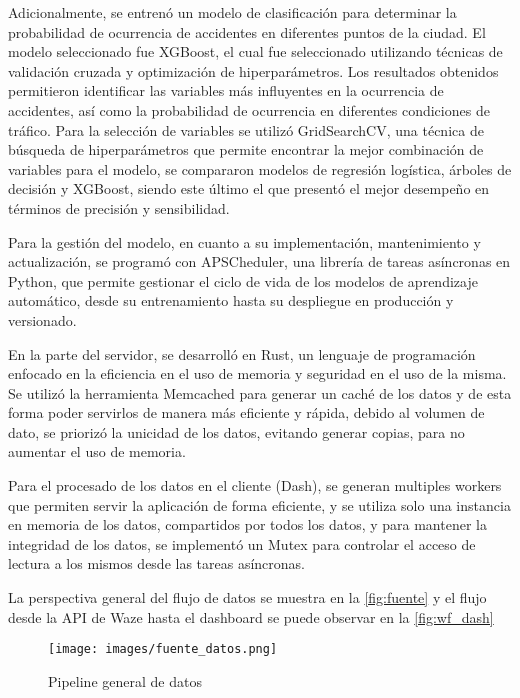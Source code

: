 \documentclass[12pt]{article}
\begin{document}
Adicionalmente, se entrenó un modelo de clasificación para determinar la probabilidad de ocurrencia de accidentes en diferentes puntos de la ciudad. El modelo seleccionado fue XGBoost, el cual fue seleccionado utilizando técnicas de validación cruzada y optimización de hiperparámetros. Los resultados obtenidos permitieron identificar las variables más influyentes en la ocurrencia de accidentes, así como la probabilidad de ocurrencia en diferentes condiciones de tráfico. Para la selección de variables se utilizó GridSearchCV, una técnica de búsqueda de hiperparámetros que permite encontrar la mejor combinación de variables para el modelo, se compararon modelos de regresión logística, árboles de decisión y XGBoost, siendo este último el que presentó el mejor desempeño en términos de precisión y sensibilidad.

Para la gestión del modelo, en cuanto a su implementación, mantenimiento y actualización, se programó con APSCheduler, una librería de tareas asíncronas en Python, que permite gestionar el ciclo de vida de los modelos de aprendizaje automático, desde su entrenamiento hasta su despliegue en producción y versionado.

En la parte del servidor, se desarrolló en Rust, un lenguaje de programación enfocado en la eficiencia en el uso de memoria y seguridad en el uso de la misma. Se utilizó la herramienta Memcached para generar un caché de los datos y de esta forma poder servirlos de manera más eficiente y rápida, debido al volumen de dato, se priorizó la unicidad de los datos, evitando generar copias, para no aumentar el uso de memoria.

Para el procesado de los datos en el cliente (Dash), se generan multiples workers que permiten servir la aplicación de forma eficiente, y se utiliza solo una instancia en memoria de los datos, compartidos por todos los datos, y para mantener la integridad de los datos, se implementó un Mutex para controlar el acceso de lectura a los mismos desde las tareas asíncronas.

La perspectiva general del flujo de datos se muestra en la \autoref{fig:fuente} y el flujo desde la API de Waze hasta el dashboard se puede observar en la \autoref{fig:wf_dash}

\begin{figure}[h]
    \centering
    \texttt{[image: images/fuente\_datos.png]}
    \caption{Pipeline general de datos}
    \label{fig:fuente}
\end{figure}
\end{document}
